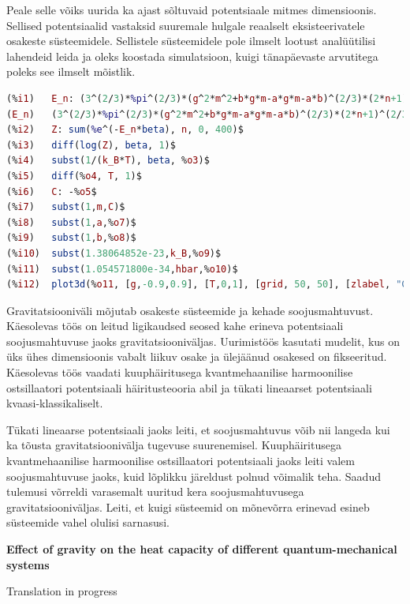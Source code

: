 \documentclass{trkut}%
\begin{document}
Peale selle võiks uurida ka ajast sõltuvaid potentsiaale mitmes dimensioonis.
Sellised potentsiaalid vastaksid suuremale hulgale reaalselt eksisteerivatele osakeste süsteemidele.
Sellistele süsteemidele pole ilmselt lootust analüütilisi lahendeid leida ja oleks koostada simulatsioon, kuigi tänapäevaste arvutitega poleks see ilmselt mõistlik.



\printbibliography
{} \label{maximalisa}
\begin{lstlisting}[language=Maxima, breaklines=true]
(%i1)	E_n: (3^(2/3)*%pi^(2/3)*(g^2*m^2+b*g*m-a*g*m-a*b)^(2/3)*(2*n+1)^(2/3)*hbar^(2/3))/(2^(5/3)*(b+a)^(2/3)*m^(1/3));
(E_n)	(3^(2/3)*%pi^(2/3)*(g^2*m^2+b*g*m-a*g*m-a*b)^(2/3)*(2*n+1)^(2/3)*hbar^(2/3))/(2^(5/3)*(b+a)^(2/3)*m^(1/3))
(%i2)	Z: sum(%e^(-E_n*beta), n, 0, 400)$
(%i3)	diff(log(Z), beta, 1)$
(%i4)	subst(1/(k_B*T), beta, %o3)$
(%i5)	diff(%o4, T, 1)$
(%i6)	C: -%o5$
(%i7)	subst(1,m,C)$
(%i8)	subst(1,a,%o7)$
(%i9)	subst(1,b,%o8)$
(%i10)	subst(1.38064852e-23,k_B,%o9)$
(%i11)	subst(1.054571800e-34,hbar,%o10)$
(%i12)	plot3d(%o11, [g,-0.9,0.9], [T,0,1], [grid, 50, 50], [zlabel, "C"], [gnuplot_pm3d,true]);
\end{lstlisting}

Gravitatsiooniväli mõjutab osakeste süsteemide ja kehade soojusmahtuvust.
Käesolevas töös on leitud ligikaudsed seosed kahe erineva potentsiaali soojusmahtuvuse jaoks gravitatsiooniväljas.
Uurimistöös kasutati mudelit, kus on üks ühes dimensioonis vabalt liikuv osake ja ülejäänud osakesed on fikseeritud.
Käesolevas töös vaadati kuuphäiritusega kvantmehaanilise harmoonilise ostsillaatori potentsiaali häiritusteooria abil ja tükati lineaarset potentsiaali kvaasi-klassikaliselt.

Tükati lineaarse potentsiaali jaoks leiti, et soojusmahtuvus võib nii langeda kui ka tõusta gravitatsioonivälja tugevuse suurenemisel.
Kuuphäiritusega kvantmehaanilise harmoonilise ostsillaatori potentsiaali jaoks leiti valem soojusmahtuvuse jaoks, kuid lõplikku järeldust polnud võimalik teha.
Saadud tulemusi võrreldi varasemalt uuritud kera soojusmahtuvusega gravitatsiooniväljas.
Leiti, et kuigi süsteemid on mõnevõrra erinevad esineb süsteemide vahel olulisi sarnasusi.



\textbf{\large Effect of gravity on the heat capacity of different quantum-mechanical systems}

Translation in progress

\end{document}
